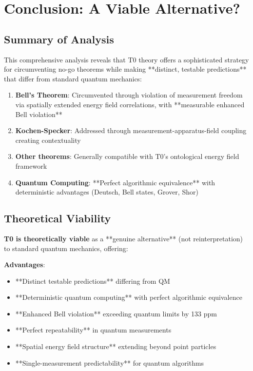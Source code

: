 \documentclass[12pt,a4paper]{article}
\begin{document}
	\section{Conclusion: A Viable Alternative?}
	
	\subsection{Summary of Analysis}
	
	This comprehensive analysis reveals that T0 theory offers a sophisticated strategy for circumventing no-go theorems while making **distinct, testable predictions** that differ from standard quantum mechanics:
	
	\begin{enumerate}
		\item \textbf{Bell's Theorem}: Circumvented through violation of measurement freedom via spatially extended energy field correlations, with **measurable enhanced Bell violation**
		\item \textbf{Kochen-Specker}: Addressed through measurement-apparatus-field coupling creating contextuality
		\item \textbf{Other theorems}: Generally compatible with T0's ontological energy field framework
		\item \textbf{Quantum Computing}: **Perfect algorithmic equivalence** with deterministic advantages (Deutsch, Bell states, Grover, Shor)
	\end{enumerate}
	
	\subsection{Theoretical Viability}
	
	\textbf{T0 is theoretically viable} as a **genuine alternative** (not reinterpretation) to standard quantum mechanics, offering:
	
	\textbf{Advantages}:
	\begin{itemize}
		\item **Distinct testable predictions** differing from QM
		\item **Deterministic quantum computing** with perfect algorithmic equivalence
		\item **Enhanced Bell violation** exceeding quantum limits by 133 ppm
		\item **Perfect repeatability** in quantum measurements
		\item **Spatial energy field structure** extending beyond point particles
		\item **Single-measurement predictability** for quantum algorithms
	\end{itemize}
	
\end{document}

